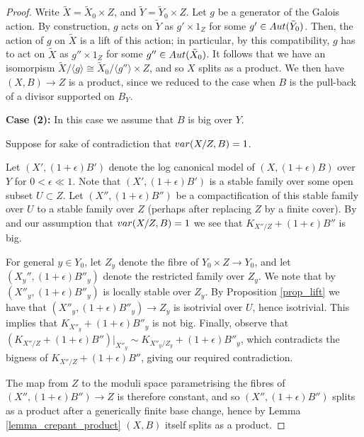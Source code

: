 \documentclass[12pt]{amsart}
\theoremstyle{plain}
\theoremstyle{definition}
\def\rar{\rightarrow}
\begin{document}
\begin{proof}
Write $\tilde{X} = \tilde{X}_0 \times Z$, and $\tilde{Y} = \tilde{Y}_0 \times Z$.  
Let $g$ be a generator of the Galois action.
By construction, $g$ acts on $\tilde{Y}$ as $g' \times 1_Z$ for some $g' \in {\rm Aut}(\tilde{Y}_0)$.
Then, the action of $g$ on $\tilde{X}$ is a lift of this action;
in particular, by this compatibility, $g$ has to act on $\tilde{X}$ as $g'' \times 1_Z$ for some $g'' \in {\rm Aut}(\tilde{X}_0)$.
 It follows that we have an isomorpism 
 $\tilde{X}/\langle g \rangle \cong \tilde{X}_0/\langle g'' \rangle \times Z$, and so $X$ splits as a product.
 We then have $(X,B) \rar Z$ is a product, 
since we reduced to the case when $B$ is the pull-back of a divisor supported on $B_Y$.

 


{\bf Case (2):} In this case we assume that $B$ is big over $Y$.

Suppose for sake of contradiction
that ${\rm var}(X/Z, B) = 1$.

Let $(X', (1+\epsilon)B')$ 
denote the log canonical model of $(X, (1+\epsilon)B)$ over $Y$ for $0<\epsilon \ll 1$.  
Note that $(X', (1+\epsilon)B')$ 
is a stable family over some open subset $U \subset Z$.
Let $(X'', (1+\epsilon)B'')$ be a compactification of this stable family over $U$
to a stable family over $Z$ (perhaps after replacing $Z$ by a finite cover).
By \cite[Corollary 8.3]{KP17} and our assumption that ${\rm var}(X/Z, B) = 1$ 
we see that $K_{X''/Z}+(1+\epsilon)B''$ is big.


For general $y \in Y_0$, let $Z_y$ denote the fibre of $Y_0 \times Z \rightarrow Y_0$,
and let $(X_y'', (1+\epsilon)B''_y)$ denote the restricted family over $Z_y$.
We note that by \cite[Proposition 2.13]{Kollar21} $(X''_y, (1+\epsilon)B''_y)$ 
is locally stable over $Z_y$.  
By
Proposition \ref{prop_lift} we have that $(X''_y, (1+\epsilon)B''_y) 
\rightarrow Z_y$ is isotrivial
over $U$, hence isotrivial.
This implies that 
$K_{X''_y}+(1+\epsilon)B''_y$ is not big.
Finally, observe that $(K_{X''/Z}+(1+\epsilon)B'')\vert_{X''_y} \sim K_{X''_y/Z_y}+(1+\epsilon)B''_y$,
which contradicts the bigness of $K_{X''/Z}+(1+\epsilon)B''$, 
giving our required contradiction.

The map from $Z$ to the moduli space parametrising the fibres
of $(X'', (1+\epsilon)B'') \rightarrow Z$ is therefore constant, and so
$(X'', (1+\epsilon)B'')$ splits as a product after a generically finite base change, 
hence by Lemma \ref{lemma_crepant_product} $(X, B)$
itself splits as a product.



\end{proof}
\end{document}
